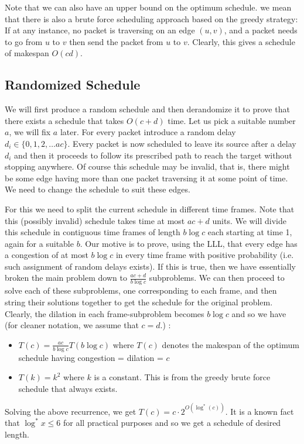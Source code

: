 Note that we can also have an upper bound on the optimum schedule. we mean that there is also a brute force scheduling approach based on the greedy strategy: If at any instance, no packet is traversing on an edge $(u,v)$, and a packet needs to go from $u$ to $v$ then send the packet from $u$ to $v$. Clearly, this gives a schedule of makespan $O(cd)$.

\subsection{Randomized Schedule}
We will first produce a random schedule and then derandomize it to prove that there exists a schedule that takes $O(c+d)$ time. Let us pick a suitable number $a$, we will fix $a$ later. For every packet introduce a random delay $d_i\in\{0,1,2,\ldots ac\} $. Every packet is now scheduled to leave its source after a delay $d_i$ and then it proceeds to follow its prescribed path to reach the target without stopping anywhere. Of course this schedule may be invalid, that is, there might be some edge having more than one packet traversing it at some point of time. We need to change the schedule to suit these edges.

For this we need to split the current schedule in different time frames. Note that this (possibly invalid) schedule takes time at most $ac+d$ units. We will divide this schedule in contiguous time frames of length $b\log c$ each starting at time 1, again for a suitable $b$. Our motive is to prove, using the LLL, that every edge has a congestion of at most $b\log c$ in every time frame with positive probability (i.e. such assignment of random delays exists). If this is true, then we have essentially broken the main problem down to $\frac{ac+d}{b\log c} $ subproblems. We can then proceed to solve each of these subproblems, one corresponding to each frame, and then string their solutions together to get the schedule for the original problem. Clearly, the dilation in each frame-subproblem becomes $b\log c$ and so we have (for cleaner notation, we assume that $c=d$.) :
\begin{itemize}
 \item $T(c) = \frac{ac}{b\log c}T(b\log c) $ where $T(c)$ denotes the makespan of the optimum schedule having congestion = dilation = $c$
 \item $T(k) = k^2 $ where $k$ is a constant. This is from the greedy brute force schedule that always exists.
\end{itemize}
Solving the above recurrence, we get $T(c)= c\cdot 2^{O(\log^*(c)) } $. It is a known fact that $\log^*x \leq 6$ for all practical purposes and so we get a schedule of desired length.

